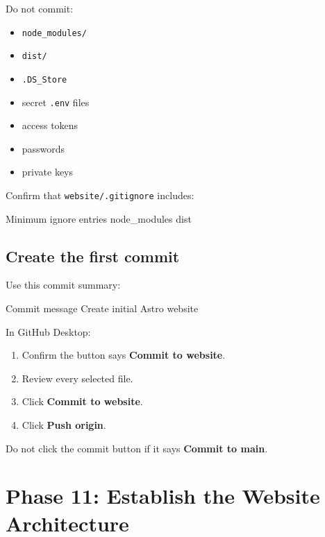 \documentclass[11pt,letterpaper]{article}
\newcommand{\filepath}[1]{\texttt{#1}}
\newcommand{\menu}[1]{\textbf{\textsf{#1}}}
\begin{document}
Do not commit:

\begin{itemize}
    \item \filepath{node\_modules/}
    \item \filepath{dist/}
    \item \filepath{.DS\_Store}
    \item secret \filepath{.env} files
    \item access tokens
    \item passwords
    \item private keys
\end{itemize}

Confirm that \filepath{website/.gitignore} includes:

\begin{codebox}{Minimum ignore entries}
node_modules
dist
\end{codebox}

\subsection{Create the first commit}

Use this commit summary:

\begin{codebox}{Commit message}
Create initial Astro website
\end{codebox}

In GitHub Desktop:

\begin{enumerate}
    \item Confirm the button says \menu{Commit to website}.
    \item Review every selected file.
    \item Click \menu{Commit to website}.
    \item Click \menu{Push origin}.
\end{enumerate}

\begin{warningbox}
Do not click the commit button if it says
\menu{Commit to main}.
\end{warningbox}

\section{Phase 11: Establish the Website Architecture}
\end{document}
